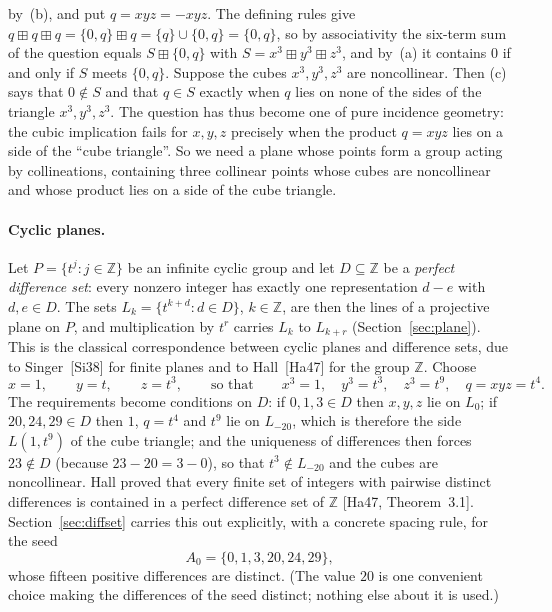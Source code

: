 \documentclass[11pt]{article}
\theoremstyle{plain}
\theoremstyle{definition}
\newcommand{\Z}{\mathbb{Z}}
\newcommand{\bp}{\boxplus}
\begin{document}
by~(b), and put $q=xyz=-xyz$.  The defining rules give
$q\bp q\bp q=\{0,q\}\bp q=\{q\}\cup\{0,q\}=\{0,q\}$, so by associativity
the six-term sum of the question equals $S\bp\{0,q\}$ with
$S=x^3\bp y^3\bp z^3$, and by~(a) it contains $0$ if and only if $S$
meets $\{0,q\}$.  Suppose the cubes $x^3,y^3,z^3$ are noncollinear.
Then (c) says that $0\notin S$ and that $q\in S$ exactly when $q$ lies
on none of the sides of the triangle $x^3,y^3,z^3$.  The question has
thus become one of pure incidence geometry: the cubic implication fails
for $x,y,z$ precisely when the product $q=xyz$ lies on a side of the
``cube triangle''.  So we need a plane whose points form a group acting
by collineations, containing three collinear points whose cubes are
noncollinear and whose product lies on a side of the cube triangle.

\paragraph{Cyclic planes.}
Let $P=\{t^j:j\in\Z\}$ be an infinite cyclic group and let
$D\subseteq\Z$ be a \emph{perfect difference set}: every nonzero
integer has exactly one representation $d-e$ with $d,e\in D$.  The sets
$L_k=\{t^{k+d}:d\in D\}$, $k\in\Z$, are then the lines of a projective
plane on $P$, and multiplication by $t^r$ carries $L_k$ to $L_{k+r}$
(Section~\ref{sec:plane}).  This is the classical correspondence between
cyclic planes and difference sets, due to Singer~[Si38] for finite
planes and to Hall~[Ha47] for the group $\Z$.  Choose
\[
 x=1,\qquad y=t,\qquad z=t^3,\qquad\text{so that}\qquad
 x^3=1,\quad y^3=t^3,\quad z^3=t^9,\quad q=xyz=t^4.
\]
The requirements become conditions on $D$: if $0,1,3\in D$ then $x,y,z$
lie on $L_0$; if $20,24,29\in D$ then $1$, $q=t^4$ and $t^9$ lie on
$L_{-20}$, which is therefore the side $L(1,t^9)$ of the cube triangle;
and the uniqueness of differences then forces $23\notin D$ (because
$23-20=3-0$), so that $t^3\notin L_{-20}$ and the cubes are
noncollinear.  Hall proved that every finite set of integers with
pairwise distinct differences is contained in a perfect difference set
of $\Z$ [Ha47, Theorem~3.1].  Section~\ref{sec:diffset} carries this
out explicitly, with a concrete spacing rule, for the seed
\[
 A_0=\{0,1,3,20,24,29\},
\]
whose fifteen positive differences are distinct.  (The value $20$ is one
convenient choice making the differences of the seed distinct; nothing
else about it is used.)
\end{document}
